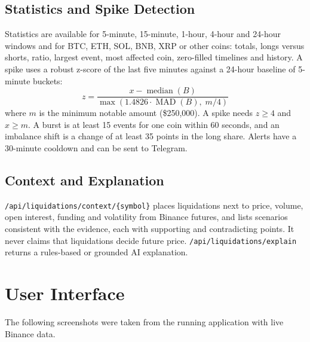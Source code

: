 \subsection{Statistics and Spike Detection}
Statistics are available for 5-minute, 15-minute, 1-hour, 4-hour and 24-hour windows and for BTC, ETH, SOL, BNB, XRP or other coins: totals, longs versus shorts, ratio, largest event, most affected coin, zero-filled timelines and history. A spike uses a robust z-score of the last five minutes against a 24-hour baseline of 5-minute buckets:
\[ z = \frac{x - \operatorname{median}(B)}{\max\left(1.4826 \cdot \operatorname{MAD}(B),\; m/4\right)} \]
where $m$ is the minimum notable amount (\$250{,}000). A spike needs $z \geq 4$ and $x \geq m$. A burst is at least 15 events for one coin within 60 seconds, and an imbalance shift is a change of at least 35 points in the long share. Alerts have a 30-minute cooldown and can be sent to Telegram.

\subsection{Context and Explanation}
\texttt{/api/liquidations/context/\{symbol\}} places liquidations next to price, volume, open interest, funding and volatility from Binance futures, and lists scenarios consistent with the evidence, each with supporting and contradicting points. It never claims that liquidations decide future price. \texttt{/api/liquidations/explain} returns a rules-based or grounded AI explanation.

\section{User Interface}
The following screenshots were taken from the running application with live Binance data.

